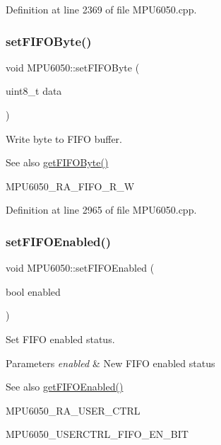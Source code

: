 Definition at line 2369 of file M\+P\+U6050.\+cpp.

\mbox{\label{classMPU6050_a66da5bc38aa82404117d1ef5306c951a}} 
\subsubsection{\texorpdfstring{setFIFOByte()}{setFIFOByte()}}
{\footnotesize\ttfamily void M\+P\+U6050\+::set\+F\+I\+F\+O\+Byte (\begin{DoxyParamCaption}\item[{uint8\+\_\+t}]{data }\end{DoxyParamCaption})}



Write byte to F\+I\+FO buffer. 

\begin{DoxySeeAlso}{See also}
\mbox{\hyperlink{classMPU6050_a7733011d30d5b64564f6b5422d8639ae}{get\+F\+I\+F\+O\+Byte()}} 

M\+P\+U6050\+\_\+\+R\+A\+\_\+\+F\+I\+F\+O\+\_\+\+R\+\_\+W 
\end{DoxySeeAlso}


Definition at line 2965 of file M\+P\+U6050.\+cpp.

\mbox{\label{classMPU6050_a78e58ab27986db6999af775ed4d43091}} 
\subsubsection{\texorpdfstring{setFIFOEnabled()}{setFIFOEnabled()}}
{\footnotesize\ttfamily void M\+P\+U6050\+::set\+F\+I\+F\+O\+Enabled (\begin{DoxyParamCaption}\item[{bool}]{enabled }\end{DoxyParamCaption})}



Set F\+I\+FO enabled status. 


\begin{DoxyParams}{Parameters}
{\em enabled} & New F\+I\+FO enabled status \\
\hline
\end{DoxyParams}
\begin{DoxySeeAlso}{See also}
\mbox{\hyperlink{classMPU6050_ae2687a09ebe0d7fbbf74f560e0dd9a44}{get\+F\+I\+F\+O\+Enabled()}} 

M\+P\+U6050\+\_\+\+R\+A\+\_\+\+U\+S\+E\+R\+\_\+\+C\+T\+RL 

M\+P\+U6050\+\_\+\+U\+S\+E\+R\+C\+T\+R\+L\+\_\+\+F\+I\+F\+O\+\_\+\+E\+N\+\_\+\+B\+IT 
\end{DoxySeeAlso}


